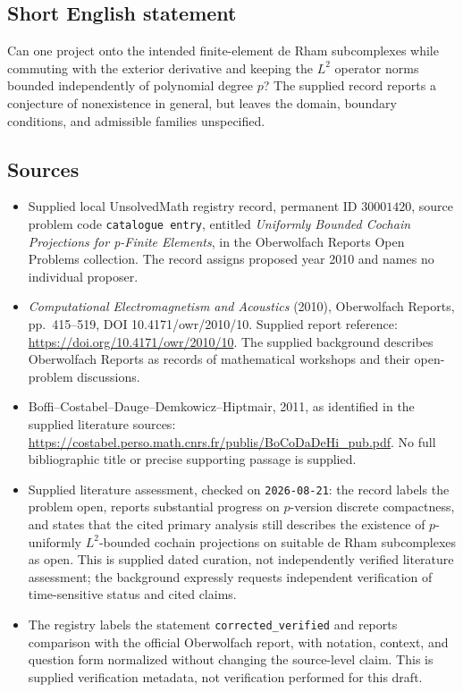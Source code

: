 \documentclass[11pt]{article}
\begin{document}
\subsection{Short English statement}
Can one project onto the intended finite-element de Rham subcomplexes while commuting with the exterior derivative and keeping the \(L^2\) operator norms bounded independently of polynomial degree \(p\)? The supplied record reports a conjecture of nonexistence in general, but leaves the domain, boundary conditions, and admissible families unspecified.
\subsection{Sources}
\begin{itemize}
\item Supplied local UnsolvedMath registry record, permanent ID \(30001420\), source problem code \texttt{catalogue entry}, entitled \emph{Uniformly Bounded Cochain Projections for p-Finite Elements}, in the Oberwolfach Reports Open Problems collection. The record assigns proposed year 2010 and names no individual proposer.
\item \emph{Computational Electromagnetism and Acoustics} (2010), Oberwolfach Reports, pp.\ 415--519, DOI 10.4171/owr/2010/10. Supplied report reference: \url{https://doi.org/10.4171/owr/2010/10}. The supplied background describes Oberwolfach Reports as records of mathematical workshops and their open-problem discussions.
\item Boffi--Costabel--Dauge--Demkowicz--Hiptmair, 2011, as identified in the supplied literature sources: \url{https://costabel.perso.math.cnrs.fr/publis/BoCoDaDeHi_pub.pdf}. No full bibliographic title or precise supporting passage is supplied.
\item Supplied literature assessment, checked on \texttt{2026-08-21}: the record labels the problem open, reports substantial progress on \(p\)-version discrete compactness, and states that the cited primary analysis still describes the existence of \(p\)-uniformly \(L^2\)-bounded cochain projections on suitable de Rham subcomplexes as open. This is supplied dated curation, not independently verified literature assessment; the background expressly requests independent verification of time-sensitive status and cited claims.
\item The registry labels the statement \texttt{corrected\_verified} and reports comparison with the official Oberwolfach report, with notation, context, and question form normalized without changing the source-level claim. This is supplied verification metadata, not verification performed for this draft.
\end{itemize}
\end{document}
